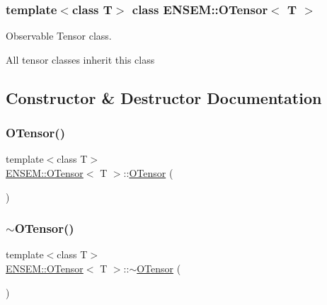\subsubsection*{template$<$class T$>$\newline
class E\+N\+S\+E\+M\+::\+O\+Tensor$<$ T $>$}

Observable Tensor class. 

All tensor classes inherit this class 

\subsection{Constructor \& Destructor Documentation}
\mbox{\label{classENSEM_1_1OTensor_a514d20086c92e7b19386708978d34483}} 
\subsubsection{\texorpdfstring{OTensor()}{OTensor()}\hspace{0.1cm}{\footnotesize\ttfamily [1/9]}}
{\footnotesize\ttfamily template$<$class T$>$ \\
\mbox{\hyperlink{classENSEM_1_1OTensor}{E\+N\+S\+E\+M\+::\+O\+Tensor}}$<$ T $>$\+::\mbox{\hyperlink{classENSEM_1_1OTensor}{O\+Tensor}} (\begin{DoxyParamCaption}{ }\end{DoxyParamCaption})\hspace{0.3cm}{\ttfamily [inline]}}

\mbox{\label{classENSEM_1_1OTensor_a7be6a7cdba7403be29ede1f21ee706f7}} 
\subsubsection{\texorpdfstring{$\sim$OTensor()}{~OTensor()}\hspace{0.1cm}{\footnotesize\ttfamily [1/3]}}
{\footnotesize\ttfamily template$<$class T$>$ \\
\mbox{\hyperlink{classENSEM_1_1OTensor}{E\+N\+S\+E\+M\+::\+O\+Tensor}}$<$ T $>$\+::$\sim$\mbox{\hyperlink{classENSEM_1_1OTensor}{O\+Tensor}} (\begin{DoxyParamCaption}{ }\end{DoxyParamCaption})\hspace{0.3cm}{\ttfamily [inline]}}

